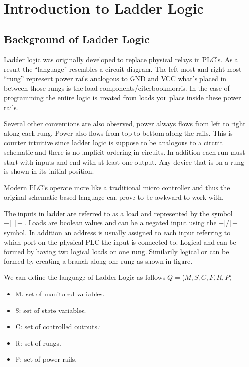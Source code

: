 
\chapter{Introduction to Ladder Logic}
\section{Background of Ladder Logic}
\label{section:ladderlogic}

Ladder logic was originally developed to replace physical relays in PLC's.
As a result the ``language'' resembles a circuit diagram. The left most
and right most ``rung'' represent power rails analogous to GND and VCC what's
placed in between those rungs is the load components/cite{ebookmorris}. In 
the case of programming the entire logic is created from loads you place 
inside these power rails. 

Several other conventions are also observed, power always flows from left 
to right along each rung. Power also flows from top to bottom along the 
rails. This is counter intuitive since ladder logic is suppose to be 
analogous to a circuit schematic and there is no implicit
ordering in circuits. In addition each run must start with inputs and end
with at least one output. Any device that is on a rung is shown in its
initial position.

Modern PLC's operate more like a traditional micro controller and thus the 
original schematic based language can prove to be awkward to work with.

The inputs in ladder are referred to as a load and represented by the 
symbol $-\vert ~ ~ \vert-$. %
Loads are boolean values and can be a negated input using the $-\vert/\vert-$ symbol. 
In addition an address is usually assigned to each input referring to 
which port on the physical PLC the input is connected to. Logical and 
can be formed by having two logical loads on one rung\cite{ebookmorris}. 
Similarily logical or can be formed by creating a branch along one 
rung as shown in figure. %

We can define the language of Ladder Logic as follows $Q = \langle M,S,C,F,R,P \rangle $

\begin{itemize}
	\item M: set of monitored variables.
	\item S: set of state variables.
	\item C: set of controlled outputs.i
        \item R: set of rungs.
	\item P: set of power rails.
\end{itemize}

